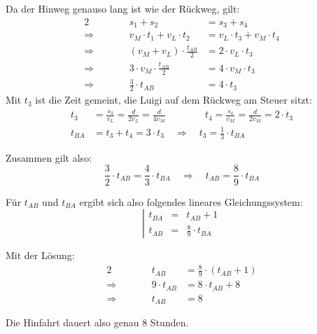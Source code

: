 \begin{exercise}
    Da der Hinweg genauso lang ist wie der Rückweg, gilt:
    \begin{alignat*}{2}
                 &       & s_{1}+s_{2}&=s_{3}+s_{4}                                               \\[2ex]
      \Rightarrow&\qquad & v_{M}\cdot t_{1}+v_{L}\cdot t_{2}&=v_{L}\cdot t_{3}+v_{M}\cdot t_{4}   \\[2ex]
      \Rightarrow&\qquad & \left(v_{M}+v_{L}\right)\cdot\frac{t_{AB}}{2}&=2\cdot v_{L}\cdot t_{3} \\[2ex]
      \Rightarrow&\qquad & 3\cdot v_{M}\cdot\frac{t_{AB}}{2}&=4\cdot v_{M}\cdot t_{3}             \\[2ex]
      \Rightarrow&\qquad & \frac{3}{2}\cdot t_{AB}&=4\cdot t_{3}
    \end{alignat*}
    Mit $t_{3}$ ist die Zeit gemeint, die Luigi auf dem Rückweg am Steuer sitzt:
    \begin{equation*}
      \begin{split}
        t_{3}&=\frac{s_{3}}{v_{L}}=\frac{d}{2v_{L}}=\frac{d}{4v_{M}}
        \qquad\qquad
        t_{4}=\frac{s_{4}}{v_{M}}=\frac{d}{2v_{M}}=2\cdot t_{3}\\[3ex]
        t_{B\!A}&=t_{3}+t_{4}=3\cdot t_{3}
        \quad\Rightarrow\quad
        t_{3}=\frac{1}{3}\cdot t_{B\!A}
      \end{split}
    \end{equation*}

    Zusammen gilt also:
    \begin{equation*}
      \frac{3}{2}\cdot t_{AB}=\frac{4}{3}\cdot t_{B\!A}
      \quad\Rightarrow\quad
      t_{AB}=\frac{8}{9}\cdot t_{B\!A}
    \end{equation*}

    Für $t_{AB}$ und $t_{B\!A}$ ergibt sich also folgendes lineares Gleichungssystem:
    \begin{equation*}
      \left|
      \begin{array}{lcl}
        t_{B\!A} & = & t_{AB}+1 \\
        t_{AB}   & = & \frac{8}{9}\cdot t_{B\!A}
      \end{array}
      \right.
    \end{equation*}

    Mit der Lösung:
    \begin{alignat*}{2}
                 &       &        t_{AB}&=\frac{8}{9}\cdot\left(t_{AB}+1\right) \\[2ex]
      \Rightarrow&\qquad & 9\cdot t_{AB}&=8\cdot t_{AB}+8                       \\[2ex]
      \Rightarrow&\qquad &        t_{AB}&=8
    \end{alignat*}

    Die Hinfahrt dauert also genau 8 Stunden.
  \fi
\end{exercise}
